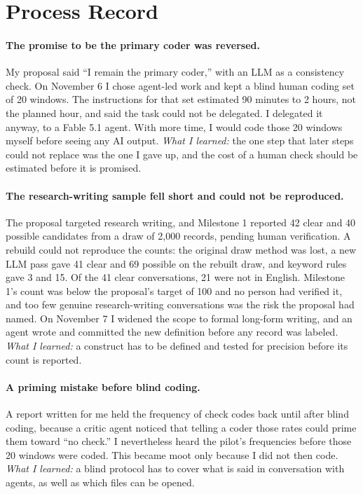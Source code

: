 \documentclass[manuscript,screen]{acmart}
\begin{document}
\section{Process Record}

\paragraph{The promise to be the primary coder was reversed.} My proposal said ``I remain the primary coder,'' with an LLM as a consistency check. On November 6 I chose agent-led work and kept a blind human coding set of 20 windows. The instructions for that set estimated 90 minutes to 2 hours, not the planned hour, and said the task could not be delegated. I delegated it anyway, to a Fable 5.1 agent. With more time, I would code those 20 windows myself before seeing any AI output. \emph{What I learned:} the one step that later steps could not replace was the one I gave up, and the cost of a human check should be estimated before it is promised.

\paragraph{The research-writing sample fell short and could not be reproduced.} The proposal targeted research writing, and Milestone 1 reported 42 clear and 40 possible candidates from a draw of 2,000 records, pending human verification. A rebuild could not reproduce the counts: the original draw method was lost, a new LLM pass gave 41 clear and 69 possible on the rebuilt draw, and keyword rules gave 3 and 15. Of the 41 clear conversations, 21 were not in English. Milestone 1's count was below the proposal's target of 100 and no person had verified it, and too few genuine research-writing conversations was the risk the proposal had named. On November 7 I widened the scope to formal long-form writing, and an agent wrote and committed the new definition before any record was labeled. \emph{What I learned:} a construct has to be defined and tested for precision before its count is reported.

\paragraph{A priming mistake before blind coding.} A report written for me held the frequency of check codes back until after blind coding, because a critic agent noticed that telling a coder those rates could prime them toward ``no check.'' I nevertheless heard the pilot's frequencies before those 20 windows were coded. This became moot only because I did not then code. \emph{What I learned:} a blind protocol has to cover what is said in conversation with agents, as well as which files can be opened.
\end{document}
